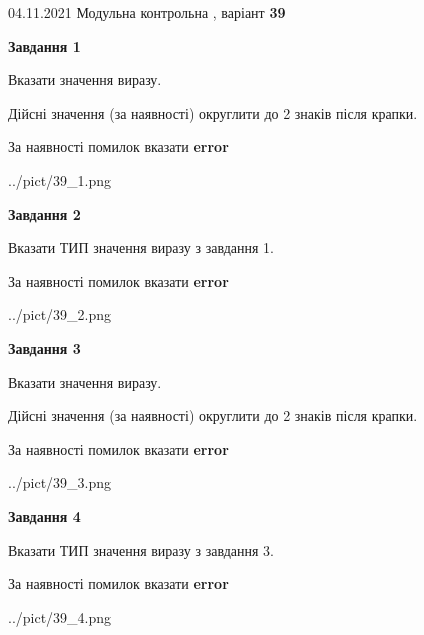 \documentclass[11pt, ukrainian]{article}
\begin{document}
{04.11.2021 Модульна контрольна , варіант  \No \textbf { 39 }\par}
{
\begin {large}
{\begin {center}\textbf{Завдання 1}\end {center}}\par
Вказати значення виразу. \par
Дійсні значення (за наявності) округлити до 2 знаків після крапки. \par
За наявності помилок вказати \textbf{error}

\begin{center}
	{../pict/39_1.png}
\end{center}
\newpage

{\begin {center}\textbf{Завдання 2}\end {center}}\par
Вказати ТИП значення виразу з завдання 1. \par
За наявності помилок вказати \textbf{error}

\begin{center}
	{../pict/39_2.png}
\end{center}
\newpage

{\begin {center}\textbf{Завдання 3}\end {center}}\par
Вказати значення виразу. \par
Дійсні значення (за наявності) округлити до 2 знаків після крапки. \par
За наявності помилок вказати \textbf{error}

\begin{center}
	{../pict/39_3.png}
\end{center}
\newpage

{\begin {center}\textbf{Завдання 4}\end {center}}\par
Вказати ТИП значення виразу з завдання 3. \par
За наявності помилок вказати \textbf{error}

\begin{center}
	{../pict/39_4.png}
\end{center}
\newpage


\end{large}}
\end{document}
